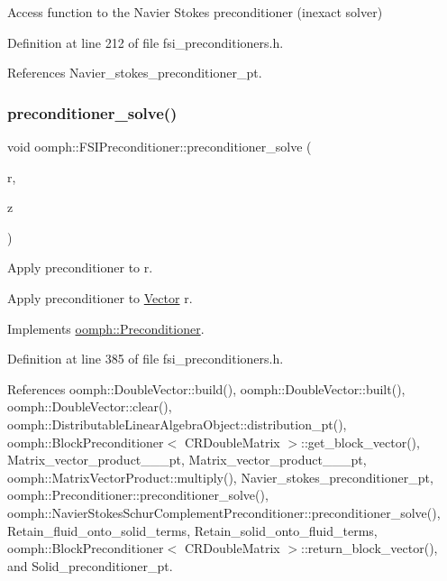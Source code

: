 Access function to the Navier Stokes preconditioner (inexact solver) 



Definition at line 212 of file fsi\+\_\+preconditioners.\+h.



References Navier\+\_\+stokes\+\_\+preconditioner\+\_\+pt.

\mbox{\label{classoomph_1_1FSIPreconditioner_a31c84c3ca19c31488acd0bf2fe333a6b}} 
\subsubsection{\texorpdfstring{preconditioner\+\_\+solve()}{preconditioner\_solve()}}
{\footnotesize\ttfamily void oomph\+::\+F\+S\+I\+Preconditioner\+::preconditioner\+\_\+solve (\begin{DoxyParamCaption}\item[{const \hyperlink{classoomph_1_1DoubleVector}{Double\+Vector} \&}]{r,  }\item[{\hyperlink{classoomph_1_1DoubleVector}{Double\+Vector} \&}]{z }\end{DoxyParamCaption})\hspace{0.3cm}{\ttfamily [virtual]}}



Apply preconditioner to r. 

Apply preconditioner to \hyperlink{classoomph_1_1Vector}{Vector} r. 

Implements \hyperlink{classoomph_1_1Preconditioner_ace1199369e4465cd2b9a34884bb64ec8}{oomph\+::\+Preconditioner}.



Definition at line 385 of file fsi\+\_\+preconditioners.\+h.



References oomph\+::\+Double\+Vector\+::build(), oomph\+::\+Double\+Vector\+::built(), oomph\+::\+Double\+Vector\+::clear(), oomph\+::\+Distributable\+Linear\+Algebra\+Object\+::distribution\+\_\+pt(), oomph\+::\+Block\+Preconditioner$<$ C\+R\+Double\+Matrix $>$\+::get\+\_\+block\+\_\+vector(), Matrix\+\_\+vector\+\_\+product\+\_\+\_\+\_\+pt, Matrix\+\_\+vector\+\_\+product\+\_\+\_\+\_\+pt, oomph\+::\+Matrix\+Vector\+Product\+::multiply(), Navier\+\_\+stokes\+\_\+preconditioner\+\_\+pt, oomph\+::\+Preconditioner\+::preconditioner\+\_\+solve(), oomph\+::\+Navier\+Stokes\+Schur\+Complement\+Preconditioner\+::preconditioner\+\_\+solve(), Retain\+\_\+fluid\+\_\+onto\+\_\+solid\+\_\+terms, Retain\+\_\+solid\+\_\+onto\+\_\+fluid\+\_\+terms, oomph\+::\+Block\+Preconditioner$<$ C\+R\+Double\+Matrix $>$\+::return\+\_\+block\+\_\+vector(), and Solid\+\_\+preconditioner\+\_\+pt.



